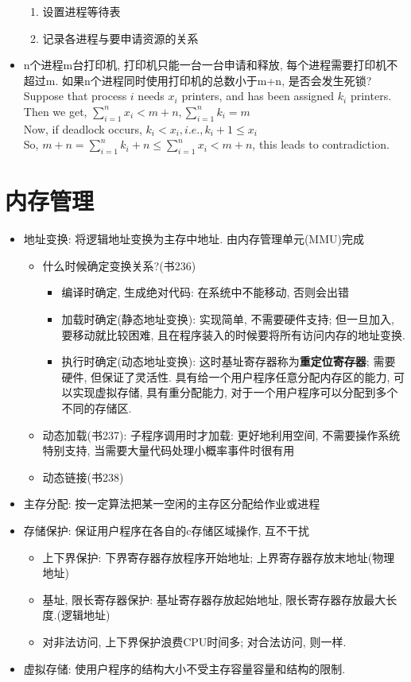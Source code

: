 \documentclass[a4paper, UTF8]{article}
\begin{document}
\begin{itemize}
\begin{enumerate}
	\item 设置进程等待表
	\item 记录各进程与要申请资源的关系
	\end{enumerate}
\item n个进程m台打印机, 打印机只能一台一台申请和释放, 每个进程需要打印机不超过m. 如果n个进程同时使用打印机的总数小于m+n, 是否会发生死锁?\\
Suppose that process $i$ needs $x_i$ printers, and has been assigned $k_i$ printers.\\
Then we get, $\sum\limits_{i=1}^{n}x_i< m+n, \sum\limits_{i=1}^{n}k_i=m$\\
Now, if deadlock occurs, $k_i< x_i, i.e., k_i+1\le x_i$\\
So, $m+n=\sum\limits_{i=1}^{n}k_i + n\le \sum\limits_{i=1}^{n}x_i<m+n$, this leads to contradiction.
\end{itemize}
\newpage
\section{内存管理}
\begin{itemize}
\item 地址变换: 将逻辑地址变换为主存中地址. 由内存管理单元(MMU)完成\\
	\begin{itemize}
	\item 什么时候确定变换关系?(书236)
		\begin{itemize}
		\item 编译时确定, 生成绝对代码: 在系统中不能移动, 否则会出错
		\item 加载时确定(静态地址变换): 实现简单, 不需要硬件支持; 但一旦加入, 要移动就比较困难, 且在程序装入的时候要将所有访问内存的地址变换.
		\item 执行时确定(动态地址变换): 这时基址寄存器称为\textbf{重定位寄存器}; 需要硬件, 但保证了灵活性. 具有给一个用户程序任意分配内存区的能力, 可以实现虚拟存储, 具有重分配能力, 对于一个用户程序可以分配到多个不同的存储区.
		\end{itemize}
	\item 动态加载(书237): 子程序调用时才加载: 更好地利用空间, 不需要操作系统特别支持, 当需要大量代码处理小概率事件时很有用
	\item 动态链接(书238)
	\end{itemize}
	
\item 主存分配: 按一定算法把某一空闲的主存区分配给作业或进程
\item 存储保护: 保证用户程序在各自的c存储区域操作, 互不干扰
	\begin{itemize}
	\item 上下界保护: 下界寄存器存放程序开始地址; 上界寄存器存放末地址(物理地址)
	\item 基址, 限长寄存器保护: 基址寄存器存放起始地址, 限长寄存器存放最大长度.(逻辑地址)
	\item 对非法访问, 上下界保护浪费CPU时间多; 对合法访问, 则一样.
	\end{itemize}
\item 虚拟存储: 使用户程序的结构大小不受主存容量容量和结构的限制.
\end{itemize}
\end{document}
